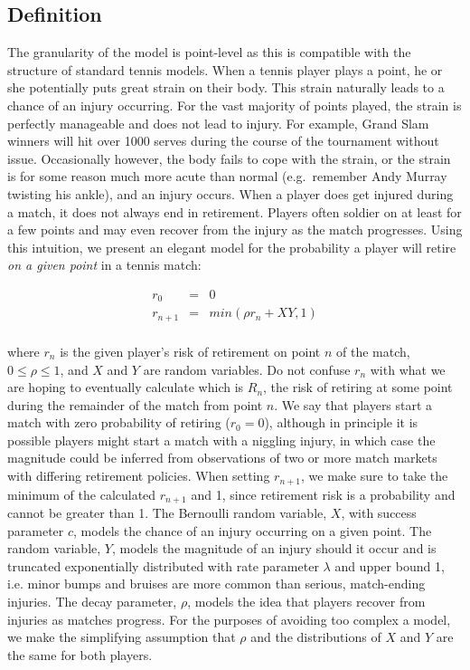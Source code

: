 \documentclass[letterpaper,12pt]{article}
\begin{document}
\subsection{Definition}

The granularity of the model is point-level as this is compatible with the structure of standard tennis models.  When a tennis player plays a point, he or she potentially puts great strain on their body.  This strain naturally leads to a chance of an injury occurring.  For the vast majority of points played, the strain is perfectly manageable and does not lead to injury.  For example, Grand Slam winners will hit over 1000 serves during the course of the tournament without issue.  Occasionally however, the body fails to cope with the strain, or the strain is for some reason much more acute than normal (e.g.\ remember Andy Murray twisting his ankle), and an injury occurs.  When a player does get injured during a match, it does not always end in retirement.  Players often soldier on at least for a few points and may even recover from the injury as the match progresses.  
Using this intuition, we present an elegant model for the probability a player will retire \textit{on a given point} in a tennis match:

\begin{center}
\begin{eqnarray*}
r_0 &=& 0 \\
r_{n+1} &=& min(\rho r_n + XY, 1) \\
\end{eqnarray*}
\end{center}

where $r_n$ is the given player's risk of retirement on point $n$ of the match, $0 \leq \rho \leq 1$, and $X$ and $Y$ are random variables.  Do not confuse $r_n$ with what we are hoping to eventually calculate which is $R_n$, the risk of retiring at some point during the remainder of the match from point $n$.  We say that players start a match with zero probability of retiring ($r_0 = 0$), although in principle it is possible players might start a match with a niggling injury, in which case the magnitude could be inferred from observations of two or more match markets with differing retirement policies.  When setting $r_{n+1}$, we make sure to take the minimum of the calculated $r_{n+1}$ and 1, since retirement risk is a probability and cannot be greater than 1.  The Bernoulli random variable, $X$, with success parameter $c$, models the chance of an injury occurring on a given point.  The random variable, $Y$, models the magnitude of an injury should it occur and is truncated exponentially distributed with rate parameter $\lambda$ and upper bound 1, i.e. minor bumps and bruises are more common than serious, match-ending injuries.  The decay parameter, $\rho$, models the idea that players recover from injuries as matches progress.  For the purposes of avoiding too complex a model, we make the simplifying assumption that $\rho$ and the distributions of $X$ and $Y$ are the same for both players.
\end{document}
